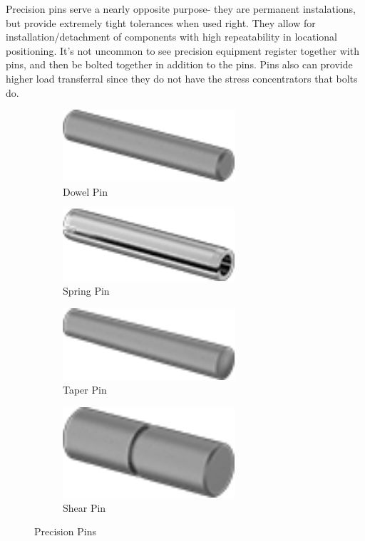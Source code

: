 \documentclass[10pt,letterpaper]{book}
\begin{document}
	
	Precision pins serve a nearly opposite purpose- they are permanent instalations, but provide extremely tight tolerances when used right. They allow for installation/detachment of components with high repeatability in locational positioning. It's not uncommon to see precision equipment register together with pins, and then be bolted together in addition to the pins. Pins also can provide higher load transferral since they do not have the stress concentrators that bolts do.
	
	\begin{figure}[H]
		\centering
		\begin{subfigure}[b]{.24\linewidth}
			\includegraphics[width=0.7\textwidth]{imgs/dpin.png}
			\caption{Dowel Pin}
		\end{subfigure}\begin{subfigure}[b]{.24\linewidth}
			\includegraphics[width=0.7\textwidth]{imgs/spin.png}
			\caption{Spring Pin}
		\end{subfigure}\begin{subfigure}[b]{.24\linewidth}
			\includegraphics[width=0.7\textwidth]{imgs/tpin.png}
			\caption{Taper Pin}
		\end{subfigure}\begin{subfigure}[b]{.24\linewidth}
			\includegraphics[width=0.7\textwidth]{imgs/shpin.png}
			\caption{Shear Pin}
		\end{subfigure}
		\caption{Precision Pins}
	\end{figure}
	
\end{document}
